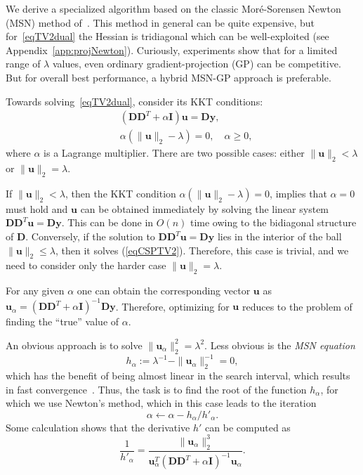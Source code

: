 \documentclass[twoside,11pt]{article}
\newcommand{\vu}{\bm{u}}       \newcommand{\vuh}{\hat{\bm{u}}}        \newcommand{\uh}{\hat{u}}    \newcommand{\vut}{\tilde{\bm{u}}}       \newcommand{\ut}{\tilde{u}}
\newcommand{\vy}{\bm{y}}       \newcommand{\vyh}{\hat{\bm{y}}}        \newcommand{\yh}{\hat{y}}    \newcommand{\vyt}{\tilde{\bm{y}}}       \newcommand{\yt}{\tilde{y}}
\newcommand{\md}{\bm{D}}
\newcommand{\mi}{\bm{I}}
\newcommand{\mynorm}[2]{\| {#1} \|_{#2}}
\newcommand{\norm}[2]{\mynorm{#1}{#2}}
\newcommand{\enorm}[1]{\mynorm{#1}{2}}
\numberwithin{equation}{section}
\numberwithin{theorem}{section}
\begin{document}
We derive a specialized algorithm based on the classic Mor\'e-Sorensen Newton (MSN) method of~\citep{More83}. This method in general can be quite expensive, but for~\eqref{eqTV2dual} the Hessian is tridiagonal which can be well-exploited (see Appendix~\ref{app:projNewton}). Curiously, experiments show that for a limited range of $\lambda$ values, even ordinary gradient-projection (GP) can be competitive. But for overall best performance, a hybrid MSN-GP approach is preferable. %

Towards solving~\eqref{eqTV2dual}, consider its KKT conditions:
\begin{equation}
 \label{eqCSPTV2}
 \begin{split}
   &(\md\md^T + \alpha \mi) \vu = \md\vy,\\
   &\alpha (\enorm{\vu} - \lambda) = 0,\quad \alpha \ge 0,
 \end{split}
\end{equation}
where $\alpha$ is a Lagrange multiplier. There are two possible cases: either $\enorm{\vu} < \lambda$ or $\enorm{\vu} = \lambda$.

If $\enorm{\vu} < \lambda$, then the KKT condition $\alpha (\enorm{\vu} - \lambda) = 0$, implies that $\alpha=0$ must hold and $\vu$ can be obtained immediately by solving the linear system $\md\md^T\vu = \md\vy$. This can be done in $O(n)$ time owing to the bidiagonal structure of $\md$. Conversely, if the solution to $\md\md^T\vu = \md\vy$ lies in the interior of the ball $\enorm{\vu} \le \lambda$, then it solves (\ref{eqCSPTV2}). Therefore, this case is trivial, and we need to consider only the harder case $\enorm{\vu}=\lambda$.

For any given $\alpha$ one can obtain the corresponding vector $\vu$ as $\vu_{\alpha} = (\md\md^T+\alpha\mi)^{-1}\md\vy$. Therefore, optimizing for $\vu$ reduces to the problem of finding the ``true'' value of $\alpha$.

An obvious approach is to solve  $\enorm{\vu_{\alpha}}^2=\lambda^2$. Less obvious is the \emph{MSN equation}
\begin{equation}
  \label{eq:25}
  h_{\alpha} := \lambda^{-1} - \norm{\vu_{\alpha}}{2}^{-1} = 0,
\end{equation}
which has the benefit of being almost linear in the search interval, which results in fast convergence~\citep{More83}. Thus, the task is to find the root of the function $h_{\alpha}$, for which we use Newton's method, which in this case leads to the iteration
\begin{equation}
  \label{eq:2}
  \alpha  \gets \alpha - h_{\alpha}/h'_{\alpha}.
\end{equation}
Some calculation shows that the derivative $h'$ can be computed as
\begin{equation}
  \label{eq:1}
  \frac{1}{h'_{\alpha}} = \frac{\enorm{\vu_{\alpha}}^3}{\vu_{\alpha}^T(\md\md^T+\alpha\mi)^{-1}\vu_{\alpha}}.
\end{equation}
\end{document}
